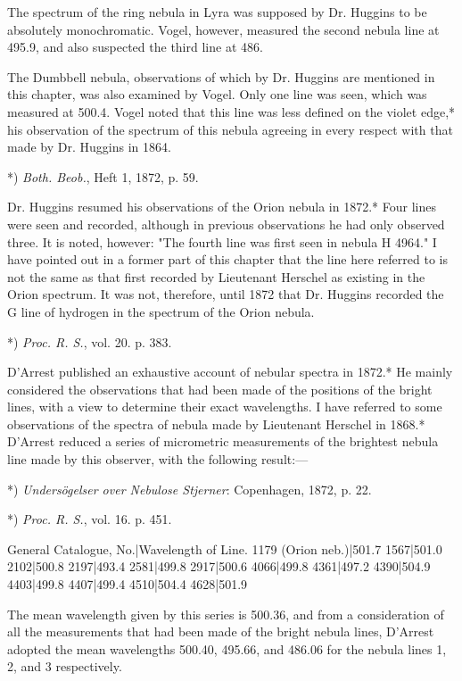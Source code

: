 \documentclass[a4paper, 12pt, oneside, polutonikogreek, english]{article}
\begin{document}
The spectrum of the ring nebula in Lyra was supposed by Dr. Huggins to be absolutely monochromatic. Vogel, however, measured the second nebula line at 495.9, and also suspected the third line at 486.

The Dumbbell nebula, observations of which by Dr. Huggins are mentioned in this chapter, was also examined by Vogel. Only one line was seen, which was measured at 500.4. Vogel noted that this line was less defined on the violet edge,* his observation of the spectrum of this nebula agreeing in every respect with that made by Dr. Huggins in 1864.

*) \emph{Both. Beob.}, Heft 1, 1872, p. 59.

Dr. Huggins resumed his observations of the Orion nebula in 1872.* Four lines were seen and recorded, although in previous observations he had only observed three. It is noted, however: "The fourth line was first seen in nebula H 4964." I have pointed out in a former part of this chapter that the line here referred to is not the same as that first recorded by Lieutenant Herschel as existing in the Orion spectrum. It was not, therefore, until 1872 that Dr. Huggins recorded the G line of hydrogen in the spectrum of the Orion nebula.

*) \emph{Proc. R. S.}, vol. 20. p. 383.

D'Arrest published an exhaustive account of nebular spectra in 1872.* He mainly considered the observations that had been made of the positions of the bright lines, with a view to determine their exact wavelengths. I have referred to some observations of the spectra of nebula made by Lieutenant Herschel in 1868.* D'Arrest reduced a series of micrometric measurements of the brightest nebula line made by this observer, with the following result:---

*) \emph{Undersögelser over Nebulose Stjerner}: Copenhagen, 1872, p. 22.

*) \emph{Proc. R. S.}, vol. 16. p. 451.

General Catalogue, No.|Wavelength of Line. 
1179 (Orion neb.)|501.7 
1567|501.0 
2102|500.8 
2197|493.4 
2581|499.8 
2917|500.6 
4066|499.8 
4361|497.2 
4390|504.9 
4403|499.8 
4407|499.4 
4510|504.4 
4628|501.9 

The mean wavelength given by this series is 500.36, and from a consideration of all the measurements that had been made of the bright nebula lines, D'Arrest adopted the mean wavelengths 500.40, 495.66, and 486.06 for the nebula lines 1, 2, and 3 respectively.
\end{document}

